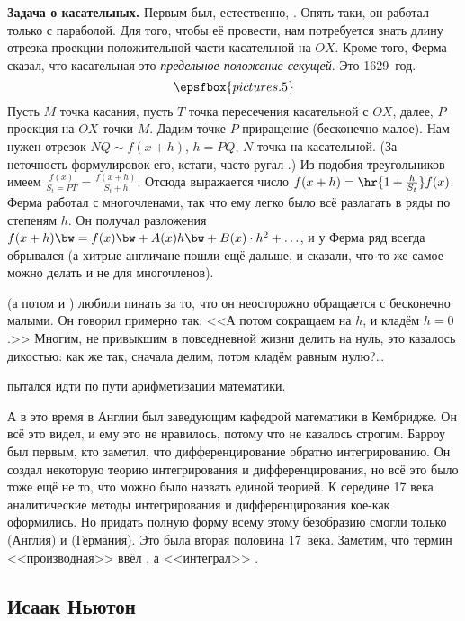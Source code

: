 \documentclass[a4paper,oneside,fleqn,10pt]{article}
\newcommand{\cpic}[1]{$$\epsfbox{pictures.#1}$$}
\begin{document}
\textbf{Задача о касательных.} Первым был, естественно, .  Опять-таки, он работал только с параболой. Для
того, чтобы её провести, нам потребуется знать длину отрезка проекции
положительной части касательной на $OX$.  Кроме того, Ферма сказал,
что касательная это \emph{предельное положение секущей}.  Это
1629~год.  \cpic{5} Пусть $M$ точка касания, пусть $T$ точка
пересечения касательной с $OX$, далее, $P$ проекция на $OX$ точки
$M$. Дадим точке $P$ приращение (бесконечно малое).  Нам нужен отрезок
$NQ \sim f(x +h)$, $h = PQ$, $N$ точка на касательной.  (За неточность
формулировок его, кстати, часто ругал .)  Из подобия
треугольников имеем $\frac{f(x)}{S_t = PT} = \frac{f(x+h)}{S_t + h}$.
Отсюда выражается число $f(x+h) = \hr{1 + \frac{h}{S_t}}f(x)$.  Ферма
работал с многочленами, так что ему легко было всё разлагать в ряды по
степеням $h$.  Он получал разложения $f(x+h) \bw= f(x) \bw+ A(x) h
\bw+ B(x)\cdot h^2 +\ldots$, и у Ферма ряд всегда обрывался (а хитрые
англичане пошли ещё дальше, и сказали, что то же самое можно делать и
не для многочленов).

 (а потом и ) любили пинать за
то, что он неосторожно обращается с бесконечно малыми.  Он говорил
примерно так: <<А потом сокращаем на $h$, и кладём $h = 0$.>> Многим,
не привыкшим в повседневной жизни делить на нуль, это казалось
дикостью: как же так, сначала делим, потом кладём равным нулю?\ldots

 пытался идти по пути арифметизации математики.

А в это время в Англии  был
заведующим кафедрой математики в Кембридже. Он всё это видел, и ему
это не нравилось, потому что не казалось строгим.  Барроу был первым,
кто заметил, что дифференцирование обратно интегрированию.  Он создал
некоторую теорию интегрирования и дифференцирования, но всё это было
тоже ещё не то, что можно было назвать единой теорией.  К середине 17
века аналитические методы интегрирования и дифференцирования кое-как
оформились.  Но придать полную форму всему этому безобразию смогли
только  (Англия) и  (Германия). Это была
вторая половина 17~века.  Заметим, что термин <<производная>> ввёл
, а <<интеграл>> .

\subsection{Исаак Ньютон}
\end{document}
